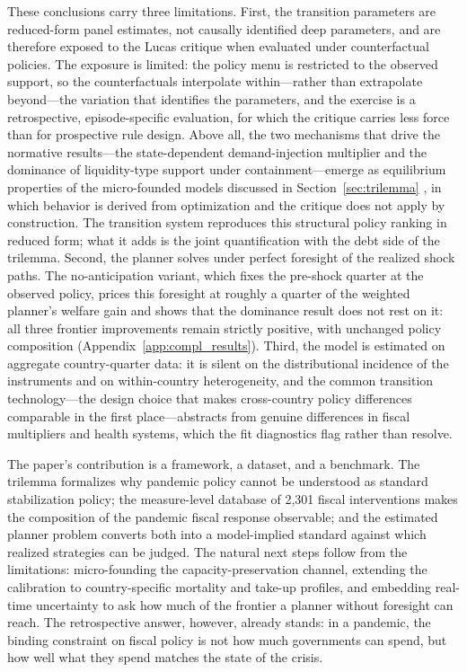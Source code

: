 \documentclass[12pt, a4paper]{article}
\begin{document}
These conclusions carry three limitations. First, the transition parameters are reduced-form panel estimates, not
causally identified deep parameters, and are therefore exposed to the Lucas
critique when evaluated under counterfactual policies. The exposure is
limited: the policy menu is restricted to the observed support, so the
counterfactuals interpolate within---rather than extrapolate beyond---the
variation that identifies the parameters, and the exercise is a
retrospective, episode-specific evaluation, for which the critique carries
less force than for prospective rule design. Above all, the two mechanisms
that drive the normative results---the state-dependent demand-injection
multiplier and the dominance of liquidity-type support under
containment---emerge as equilibrium properties of the micro-founded models
discussed in Section~\ref{sec:trilemma}
\citep{guerrieri2022,bayer2023c,fariaecastro2021}, in which behavior
is derived from optimization and the critique does not apply by
construction. The transition system reproduces this structural policy
ranking in reduced form; what it adds is the joint quantification with the
debt side of the trilemma. Second, the planner solves under perfect foresight of the
realized shock paths. The no-anticipation variant, which fixes the
pre-shock quarter at the observed policy, prices this foresight at roughly
a quarter of the weighted planner's welfare gain and shows that the
dominance result does not rest on it: all three frontier improvements
remain strictly positive, with unchanged policy composition
(Appendix~\ref{app:compl_results}).
Third, the model is estimated on aggregate country-quarter data: it is
silent on the distributional incidence of the instruments and on
within-country heterogeneity, and the common transition technology---the
design choice that makes cross-country policy differences comparable in the
first place---abstracts from genuine differences in fiscal multipliers and
health systems, which the fit diagnostics flag rather than resolve.
 
The paper's contribution is a framework, a dataset, and a benchmark. The
trilemma formalizes why pandemic policy cannot be understood as standard
stabilization policy; the measure-level database of 2,301 fiscal
interventions makes the composition of the pandemic fiscal response
observable; and the estimated planner problem converts both into a
model-implied standard against which realized strategies can be judged.
The natural next steps follow from the limitations: micro-founding the
capacity-preservation channel, extending the calibration to
country-specific mortality and take-up profiles, and embedding real-time
uncertainty to ask how much of the frontier a planner without foresight
can reach. The retrospective answer, however, already stands: in a
pandemic, the binding constraint on fiscal policy is not how much
governments can spend, but how well what they spend matches the state of
the crisis.
\newpage
\end{document}
